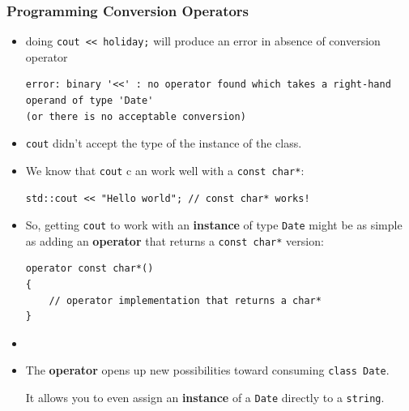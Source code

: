 \documentclass[10pt]{article}
\begin{document}
\subsubsection{Programming Conversion Operators}
\begin{itemize}
	\item doing \verb|cout << holiday;| will produce an error in absence of conversion operator

		\begin{verbatim}
error: binary '<<' : no operator found which takes a right-hand operand of type 'Date' 
(or there is no acceptable conversion)
		\end{verbatim}

	\item \verb|cout| didn't accept the type of the instance of the class.

	\item We know that \verb|cout| c an work well with a \verb|const char*|:
		\begin{verbatim}
std::cout << "Hello world";	// const char* works!
		\end{verbatim}

	\item So, getting \verb|cout| to work with an \textbf{instance} of type \verb|Date| might be as simple as adding an \textbf{operator} that returns a \verb|const char*| version:
		\begin{verbatim}
operator const char*()
{
	// operator implementation that returns a char*
}
		\end{verbatim}

	\item {}

	\item The \textbf{operator} opens up new possibilities toward consuming \verb|class Date|.

	It allows you to even assign an \textbf{instance} of a \verb|Date| directly to a \verb|string|.
\end{itemize}
\end{document}
